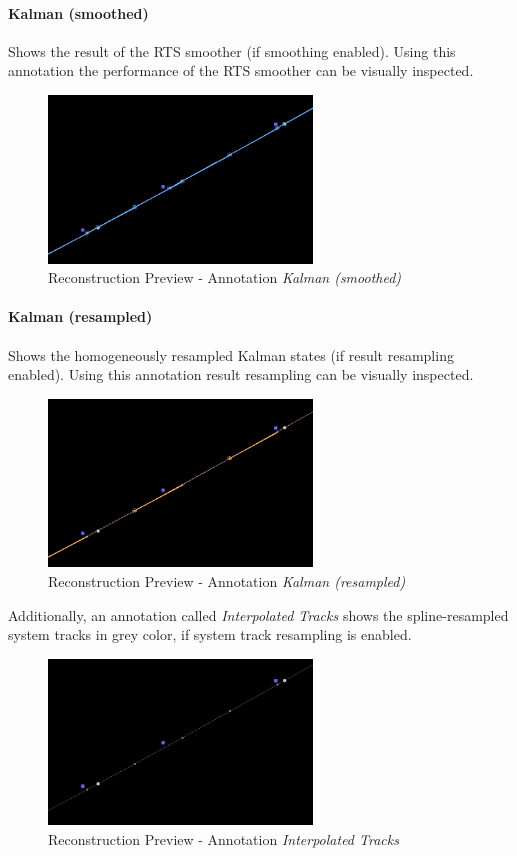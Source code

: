 \paragraph{Kalman (smoothed)} Shows the result of the RTS smoother (if smoothing enabled).
Using this annotation the performance of the RTS smoother can be visually inspected.

\begin{figure}[H]
    \center
      \includegraphics[width=7cm]{figures/ui_task_references_recprev_smoothed.png}
    \caption{Reconstruction Preview - Annotation \textit{Kalman (smoothed)}} 
\end{figure}

\paragraph{Kalman (resampled)} Shows the homogeneously resampled Kalman states (if result resampling enabled).
Using this annotation result resampling can be visually inspected.

\begin{figure}[H]
    \center
      \includegraphics[width=7cm]{figures/ui_task_references_recprev_final.png}
    \caption{Reconstruction Preview - Annotation \textit{Kalman (resampled)}} 
\end{figure}

Additionally, an annotation called \textit{Interpolated Tracks} shows the spline-resampled system tracks in grey color,
if system track resampling is enabled.

\begin{figure}[H]
    \center
      \includegraphics[width=7cm]{figures/ui_task_references_recprev_interp.png}
    \caption{Reconstruction Preview - Annotation \textit{Interpolated Tracks}} 
\end{figure}
